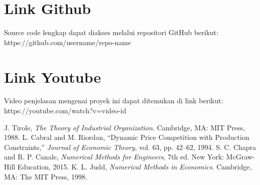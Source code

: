 \documentclass[conference]{IEEEtran}
\begin{document}
\section{Link Github}
Source code lengkap dapat diakses melalui repositori GitHub berikut:
https://github.com/username/repo-name

\section{Link Youtube}
Video penjelasan mengenai proyek ini dapat ditemukan di link berikut:
https://youtube.com/watch?v=video-id

\begin{thebibliography}{00}
 J. Tirole, \textit{The Theory of Industrial Organization}. Cambridge, MA: MIT Press, 1988.
 L. Cabral and M. Riordan, ``Dynamic Price Competition with Production Constraints,'' \textit{Journal of Economic Theory}, vol. 63, pp. 42--62, 1994.
 S. C. Chapra and R. P. Canale, \textit{Numerical Methods for Engineers}, 7th ed. New York: McGraw-Hill Education, 2015.
 K. L. Judd, \textit{Numerical Methods in Economics}. Cambridge, MA: The MIT Press, 1998.
\end{thebibliography}
\end{document}
